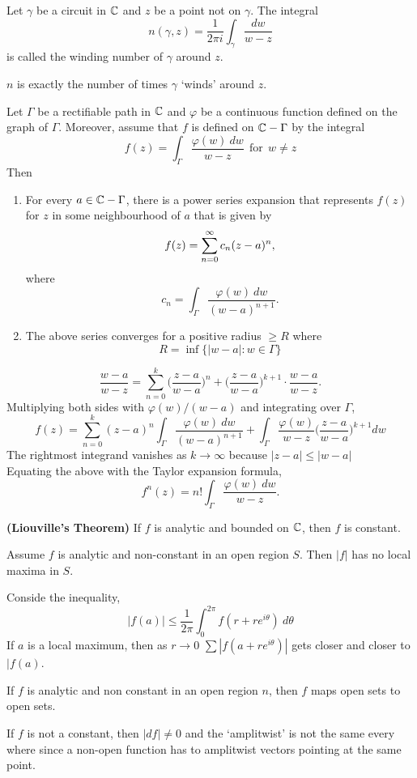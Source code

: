 \documentclass[10pt,a4paper]{book}
\begin{document}
\begin{deff}
Let $\gamma$ be a circuit in $\mathbb{C}$ and $z$ be a point not on $\gamma$. The integral
$$n(\gamma, z) = \dfrac{1}{2\pi i}\int_\gamma \dfrac{dw}{w-z}$$
is called the winding number of $\gamma$ around $z$.
\end{deff}
\PP $n$ is exactly the number of times $\gamma$ `winds' around $z$. 

\begin{Thm}
Let $\Gamma$ be a rectifiable path in $\mathbb{C}$ and $\varphi$ be a continuous function defined on the graph of $\Gamma$. Moreover, assume that $f$ is defined on $\mathbb{C} - \Gamma$ by the integral
$$f(z) = \int_\Gamma \dfrac{\varphi(w)\ dw}{w-z}  \ \ \text{for} \ \ w \neq z $$
Then 
\begin{enumerate}
    \item For every $a \in \mathbb{C} - \Gamma$, there is a power series expansion that represents $f(z)$ for $z$ in some neighbourhood of $a$ that is given by
            $$f(z) = \sum_{n = 0}^\infty c_n(z-a)^n,$$
        where 
            $$c_n = \int_{\Gamma} \dfrac{\varphi(w) \ dw}{(w-a)^{n+1}}.$$
    \item The above series converges for a positive radius $\geq R$ where 
    $$R = \inf \{|w - a|: w \in \Gamma\}$$

\end{enumerate}
\end{Thm}
\PP 
$$\dfrac{w-a}{w-z} = \sum_{n = 0}^k \bigg(\dfrac{z-a}{w-a}\bigg)^{n} + \bigg(\dfrac{z-a}{w-a}\bigg)^{k+1} \cdot \dfrac{w-a}{w-z}.$$
Multiplying both sides with $\varphi(w)/(w - a)$ and integrating over $\Gamma$,
$$f(z) = \sum_{n = 0}^k (z-a)^n \int_\Gamma \dfrac{\varphi(w) \ dw}{(w-a)^{n+1}} + \int_\Gamma \dfrac{\varphi(w) }{w-z} \bigg(\dfrac{z-a}{w-a}\bigg)^{k+1} dw$$
The rightmost integrand vanishes as $k \to \infty$ because $|z-a| \leq |w-a|$
\\
Equating the above with the Taylor expansion formula,
$$f^{n}(z) = n! \int_\Gamma \dfrac{\varphi(w)\ dw}{w - z}.$$

\begin{Thm}{\textbf{(Liouville's Theorem)}}
If $f$ is analytic and bounded on $\mathbb{C}$, then $f$ is constant.
    
\end{Thm}
\begin{Thm}
    Assume $f$ is analytic and non-constant in an open region $S$. Then $|f|$ has no local maxima in $S$.
\end{Thm}
\PP Conside the inequality,
$$|f(a)| \leq \dfrac{1}{2\pi}\int_0^{2\pi} f( r + re^{i\theta})\ d\theta$$
If $a$ is a local maximum, then as $r \to 0$ $\sum |f(a + re^{i\theta})|$ gets closer and closer to $|f(a)$.
\begin{Thm}
If $f$ is analytic and non constant in an open region $n$, then $f$ maps open sets to open sets.
\end{Thm}
\PP If $f$ is not a constant, then $|df| \neq 0$ and the `amplitwist' is not the same every where since a non-open function has to amplitwist vectors pointing at the same point.
\end{document}
